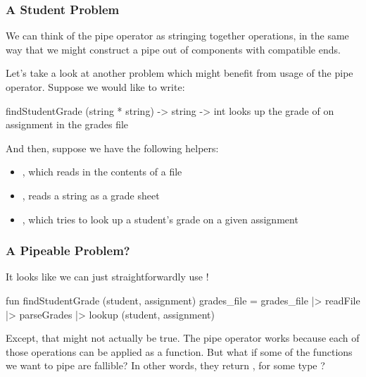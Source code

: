 \documentclass[aspectratio=169, handout]{beamer}
\begin{document}
\begin{frame}[fragile]
  \frametitle{A Student Problem}

  We can think of the pipe operator as stringing together operations, in the same way
  that we might construct a pipe out of components with compatible ends.

  \pause
  \vspace{\fill}

  Let's take a look at another problem which might benefit from usage of the
  pipe operator. Suppose we would like to write:

  \pause
  \vspace{\fill}

  \spec
    {findStudentGrade}
    {(string * string) -> string -> int}
    {}
    { looks up the grade of 
    on assignment  in the grades file }

  \pause
  \vspace{\fill}

  And then, suppose we have the following helpers:
  \begin{itemize}
    \item {}, which reads in the contents of a file
    \item {}, reads a string as a grade sheet
    \item {}, which tries to look up a student's
    grade on a given assignment
  \end{itemize}
\end{frame}

\begin{frame}[fragile]
  \frametitle{A Pipeable Problem?}

  It looks like we can just straightforwardly use \code{|>}!

  \pause
  \vspace{\fill}

  \begin{codeblock}
    fun findStudentGrade (student, assignment) grades_file =
      grades_file
      |> readFile
      |> parseGrades
      |> lookup (student, assignment)
  \end{codeblock}

  \pause
  \vspace{\fill}

  Except, that might not actually be true. The pipe operator works because each
  of those operations can be applied as a function. But what if some of the
  functions we want to pipe are fallible? In other words, they return
  , for some type ?
\end{frame}
\end{document}

